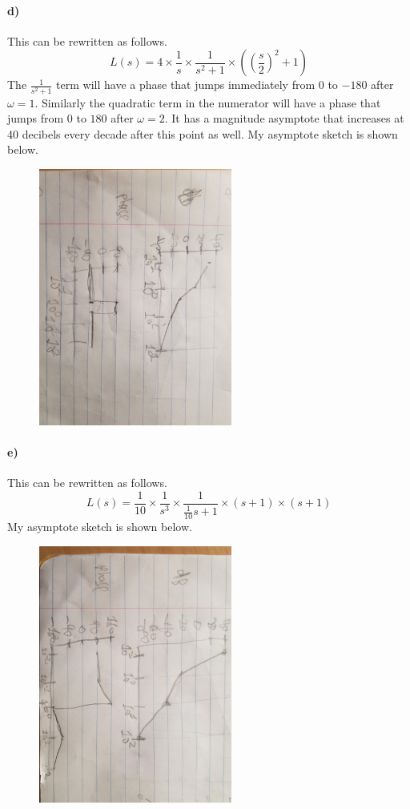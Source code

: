 \documentclass[12pt]{article}
\begin{document}
\paragraph{d)}

This can be rewritten as follows.
\[L(s)=4\times\frac{1}{s}\times\frac{1}{s^2+1}\times\left(\left(\frac{s}{2}\right)^2+1\right)\]
The \(\frac{1}{s^2+1}\) term will have a phase that jumps immediately from 0 to \(-180\) after \(\omega=1\). Similarly
the quadratic term in the numerator will have a phase that jumps from 0 to \(180\) after \(\omega=2\). It has a magnitude asymptote
that increases at 40 decibels every decade after this point as well.
My asymptote sketch is shown below.
\begin{figure}[H]
    \begin{center}
        \includegraphics[width=2.5in]{problem1d.jpg}
    \end{center}
\end{figure}

\paragraph{e)}

This can be rewritten as follows.
\[L(s)=\frac{1}{10}\times\frac{1}{s^3}\times\frac{1}{\frac{1}{10}s+1}\times(s+1)\times(s+1)\]
My asymptote sketch is shown below.
\begin{figure}[H]
    \begin{center}
        \includegraphics[width=2.5in]{problem1e.jpg}
    \end{center}
\end{figure}
\end{document}

